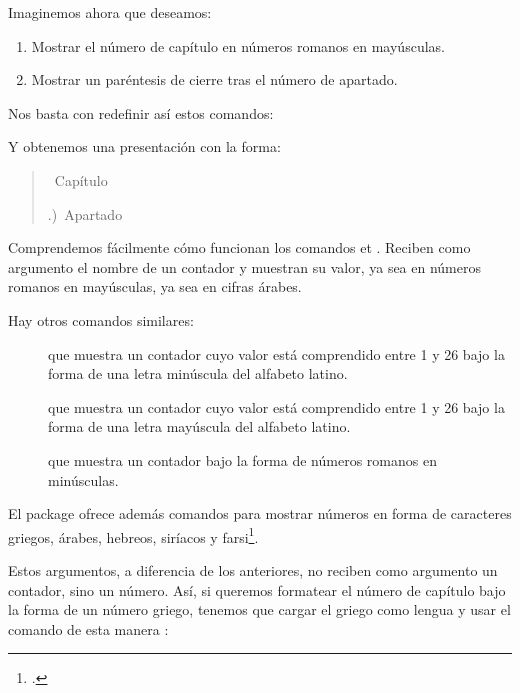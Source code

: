 Imaginemos ahora que deseamos:
\begin{enumerate}
\item Mostrar el número de capítulo en números romanos en mayúsculas.
\item Mostrar un paréntesis de cierre tras el número de apartado.
\end{enumerate}

Nos basta con redefinir así estos comandos:

\begin{latexcode}
\renewcommand\thechapter{\Roman{chapter}}
\renewcommand\thesection{\arabic{section}}
\end{latexcode} 






Y obtenemos una presentación con la forma:


\makeatletter
\let\oldthechapter\thechapter
\let\oldthesection\thesection
\renewcommand \thechapter {\@Roman\c@chapter}
\renewcommand \thesection {\thechapter.\@arabic\c@section)}
\makeatother
\begin{quotation}
\thechapter~Capítulo 

\thesection~Apartado
\end{quotation}
\renewcommand{\thechapter}{\oldthechapter}
\renewcommand{\thesection}{\oldthesection}

Comprendemos fácilmente cómo funcionan los comandos  et . Reciben como argumento el nombre de un contador y muestran su valor, ya sea en números romanos en mayúsculas, ya sea en cifras árabes. 

Hay otros comandos similares:
\begin{description}
 \item[]que muestra un contador cuyo valor está comprendido entre 1 y 26 bajo la forma de una letra minúscula del alfabeto latino. 
  \item[]que muestra un contador cuyo valor está comprendido entre 1 y 26 bajo la forma de una letra mayúscula del alfabeto latino. 
 \item[]que muestra un contador bajo la forma de números romanos en minúsculas.
\end{description}

\begin{plusloins}
El package  ofrece además comandos para mostrar números en forma de caracteres griegos, árabes, hebreos, siríacos y farsi\footcite{polyglossia_alphabetic_numbering}. 

Estos argumentos, a diferencia de los anteriores, no reciben como argumento un contador, sino un número. Así, si queremos formatear el número de capítulo bajo la forma de un número griego, tenemos que cargar el griego como lengua y usar el comando de esta manera :

\begin{latexcode}
\renewcommand{\thechapter}{\greeknumeral{\arabic{chapter}}}
\end{latexcode}
\end{plusloins}

